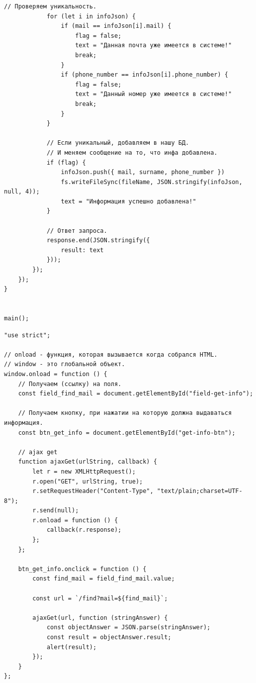 \begin{lstlisting}[caption=Код программы. TASK\_1. Код программы]
			// Проверяем уникальность.
			for (let i in infoJson) {
				if (mail == infoJson[i].mail) {
					flag = false;
					text = "Данная почта уже имеется в системе!"
					break;
				}
				if (phone_number == infoJson[i].phone_number) {
					flag = false;
					text = "Данный номер уже имеется в системе!"
					break;
				}
			}

			// Если уникальный, добавляем в нашу БД.
			// И меняем сообщение на то, что инфа добавлена.
			if (flag) {
				infoJson.push({ mail, surname, phone_number })
				fs.writeFileSync(fileName, JSON.stringify(infoJson, null, 4));
				text = "Информация успешно добавлена!"
			}

			// Ответ запроса.
			response.end(JSON.stringify({
				result: text
			}));
		});
	});
}


main();
\end{lstlisting}

\begin{lstlisting}[caption=Код программы. TASK\_1. Дополнительный скрипт]
	"use strict";

// onload - функция, которая вызывается когда собрался HTML.
// window - это глобальной объект.
window.onload = function () {
	// Получаем (ссылку) на поля.
	const field_find_mail = document.getElementById("field-get-info");

	// Получаем кнопку, при нажатии на которую должна выдаваться информация.
	const btn_get_info = document.getElementById("get-info-btn");

	// ajax get
	function ajaxGet(urlString, callback) {
		let r = new XMLHttpRequest();
		r.open("GET", urlString, true);
		r.setRequestHeader("Content-Type", "text/plain;charset=UTF-8");
		r.send(null);
		r.onload = function () {
			callback(r.response);
		};
	};

	btn_get_info.onclick = function () {
		const find_mail = field_find_mail.value;

		const url = `/find?mail=${find_mail}`;

		ajaxGet(url, function (stringAnswer) {
			const objectAnswer = JSON.parse(stringAnswer);
			const result = objectAnswer.result;
			alert(result);
		});
	}
};
\end{lstlisting}

